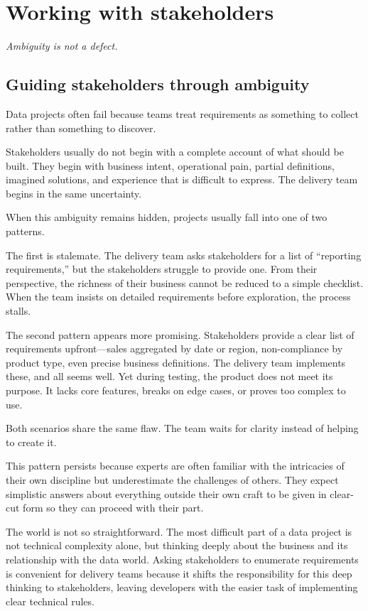 \documentclass[10pt,openany,10pt]{book}
\begin{document}
\newpage

\chapter{Working with
stakeholders}\label{docs-judgement-under-ambiguity-working-with-stakeholders}

\emph{Ambiguity is not a defect.}

\section{Guiding stakeholders through
ambiguity}\label{guiding-stakeholders-through-ambiguity}

Data projects often fail because teams treat requirements as something
to collect rather than something to discover.

Stakeholders usually do not begin with a complete account of what should
be built. They begin with business intent, operational pain, partial
definitions, imagined solutions, and experience that is difficult to
express. The delivery team begins in the same uncertainty.

When this ambiguity remains hidden, projects usually fall into one of
two patterns.

The first is stalemate. The delivery team asks stakeholders for a list
of ``reporting requirements,'' but the stakeholders struggle to provide
one. From their perspective, the richness of their business cannot be
reduced to a simple checklist. When the team insists on detailed
requirements before exploration, the process stalls.

The second pattern appears more promising. Stakeholders provide a clear
list of requirements upfront---sales aggregated by date or region,
non-compliance by product type, even precise business definitions. The
delivery team implements these, and all seems well. Yet during testing,
the product does not meet its purpose. It lacks core features, breaks on
edge cases, or proves too complex to use.

Both scenarios share the same flaw. The team waits for clarity instead
of helping to create it.

This pattern persists because experts are often familiar with the
intricacies of their own discipline but underestimate the challenges of
others. They expect simplistic answers about everything outside their
own craft to be given in clear-cut form so they can proceed with their
part.

The world is not so straightforward. The most difficult part of a data
project is not technical complexity alone, but thinking deeply about the
business and its relationship with the data world. Asking stakeholders
to enumerate requirements is convenient for delivery teams because it
shifts the responsibility for this deep thinking to stakeholders,
leaving developers with the easier task of implementing clear technical
rules.
\end{document}
